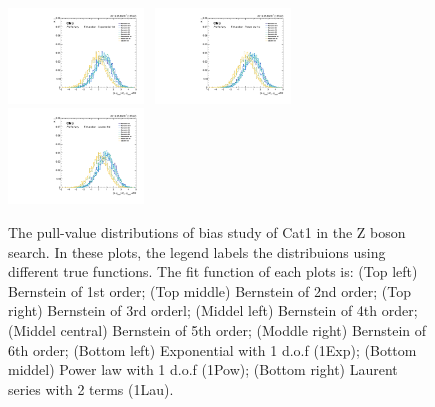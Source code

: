 \begin{figure}[p]
  \includegraphics[width=0.32\textwidth]{Fig/BiasStudy/Pull/ZJpsiG_Cat1/pull_fitfunc6_leastbias}~
  \includegraphics[width=0.32\textwidth]{Fig/BiasStudy/Pull/ZJpsiG_Cat1/pull_fitfunc7_leastbias}~
  \includegraphics[width=0.32\textwidth]{Fig/BiasStudy/Pull/ZJpsiG_Cat1/pull_fitfunc8_leastbias}\\
  \caption{The pull-value distributions of bias study of Cat1 in the Z boson search. In these plots, the legend labels the distribuions using different true functions. The fit function of each plots is: (Top left) Bernstein of 1st order; (Top middle) Bernstein of 2nd order; (Top right) Bernstein of 3rd orderl; (Middel left) Bernstein of 4th order; (Middel central) Bernstein of 5th order; (Moddle right) Bernstein of 6th order; (Bottom left) Exponential with 1 d.o.f (1Exp); (Bottom middel) Power law with 1 d.o.f (1Pow); (Bottom right) Laurent series with 2 terms (1Lau).}
  \label{fig:Pull_ZJpsiG_Cat1_v2}
\end{figure}

